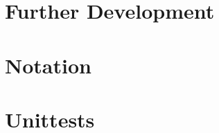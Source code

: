 \documentclass[x11names,twoside,english]{uiofysmaster}
\begin{document}
%   
%
%   
%
%   
%
\appendix
\chapter{Further Development}
    

\chapter{Notation}
    

\chapter{Unittests}
    
%
%     
%
%     
%     

%     


%
\printbibliography
\end{document}
